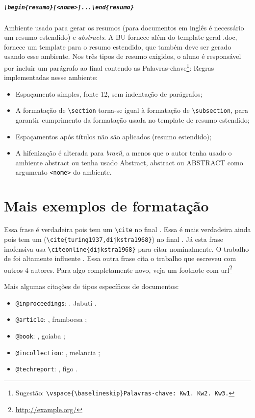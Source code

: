 \documentclass[embeddedlogo]{../ufsc-thesis-rn46-2019}
\newcommand{\lacmd}[1]{\texttt{\textbackslash{}#1}}
\newcommand{\laenvi}[2]{\texttt{\textbackslash{}begin\{#1\}[#2]...\textbackslash{}end\{#1\}}}
\begin{document}
\paragraph*{\laenvi{resumo}{<nome>}}
Ambiente usado para gerar os resumos (para documentos em inglês é necessário um
resumo estendido) e \emph{abstracts}. A BU fornece além do template geral .doc,
fornece um template para o resumo estendido, que também deve ser gerado usando
esse ambiente. Nos três tipos de resumo exigidos, o aluno é responsável por
incluir um parágrafo ao final contendo as Palavras-chave\footnote{Sugestão:
  \lacmd{vspace\{\lacmd{baselineskip}\}Palavras-chave: Kw1. Kw2. Kw3.}}: Regras
implementadas nesse ambiente:
\begin{itemize}
\item Espaçamento simples, fonte 12, sem indentação de parágrafos;
\item A formatação de \lacmd{section} torna-se igual à formatação de
  \lacmd{subsection}, para garantir cumprimento da formatação usada no template de
  resumo estendido;
\item Espaçamentos após títulos não são aplicados (resumo estendido);
\item A hifenização é alterada para \textit{brazil}, a menos que o autor tenha
  usado o ambiente abstract ou tenha usado Abstract, abstract ou ABSTRACT como
  argumento \texttt{<nome>} do ambiente.
\end{itemize}

\chapter{Mais exemplos de formatação}
\label{ch:ex}

Essa frase é verdadeira pois tem um \lacmd{cite} no final \cite{turing1937}. Essa
é mais verdadeira ainda pois tem um (\lacmd{cite\{turing1937,dijkstra1968\}}) no
final \cite{turing1937,dijkstra1968}. Já esta frase inofensiva usa
\lacmd{citeonline\{dijkstra1968\}} para citar 
nominalmente. O trabalho de  foi altamente influente
\cite{diffie1976}. Essa outra frase cita o trabalho que 
escreveu com outros 4 autores. Para algo completamente novo, veja um footnote
com url\footnote{\url{http://example.org/}}

Mais algumas citações de tipos específicos de documentos:
\begin{itemize}
\item \texttt{@inproceedings}: . Jabuti
  \cite{Ullman1989magic}.
\item \texttt{@article}: , framboesa \cite{Distefano2019};
\item \texttt{@book}: , goiaba \cite{Abiteboul1995};
\item \texttt{@incollection}: , melancia \cite{Forgy1989};
\item \texttt{@techreport}: , figo \cite{rdf11}.
\end{itemize}
\end{document}
